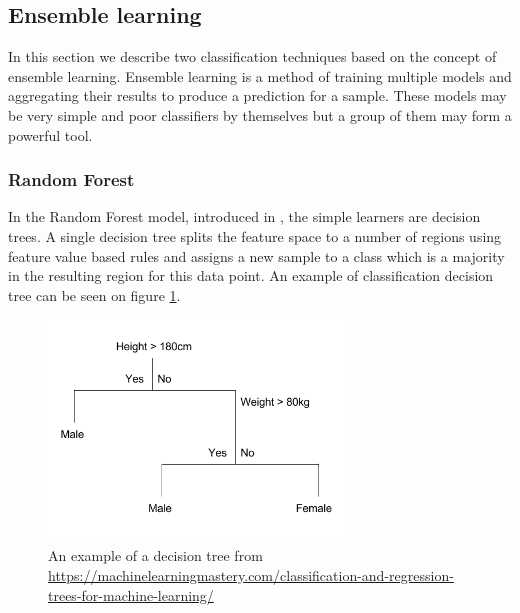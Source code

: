 \documentclass[shortabstract, english, mgr]{iithesis}
\begin{document}
\subsection{Ensemble learning}

In this section we describe two classification techniques based on the concept of ensemble learning. Ensemble learning is a method of training multiple models and aggregating their results to produce a prediction for a sample. These models may be very simple and poor classifiers by themselves but a group of them may form a powerful tool.

\subsubsection{Random Forest}

In the Random Forest model, introduced in \cite{RF}, the simple learners are decision trees. A single decision tree splits the feature space to a number of regions using feature value based rules and assigns a new sample to a class which is a majority in the resulting region for this data point. An example of classification decision tree can be seen on figure \ref{fig:decision-tree}.

\begin{figure}
\centering
\includegraphics[width=0.7\textwidth]{images/decision_tree.png}
\caption{An example of a decision tree from \url{https://machinelearningmastery.com/classification-and-regression-trees-for-machine-learning/}}
\label{fig:decision-tree}
\end{figure}
\end{document}
